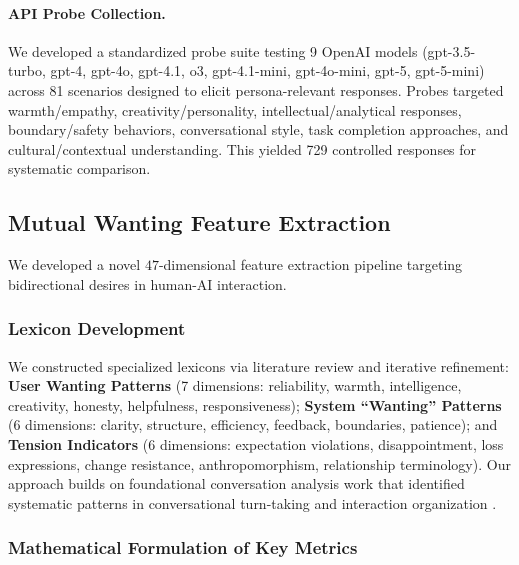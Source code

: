 \documentclass{article}
\begin{document}
\paragraph{API Probe Collection.}
We developed a standardized probe suite testing 9 OpenAI models (gpt-3.5-turbo, gpt-4, gpt-4o, gpt-4.1, o3, gpt-4.1-mini, gpt-4o-mini, gpt-5, gpt-5-mini) across 81 scenarios designed to elicit persona-relevant responses. Probes targeted warmth/empathy, creativity/personality, intellectual/analytical responses, boundary/safety behaviors, conversational style, task completion approaches, and cultural/contextual understanding. This yielded 729 controlled responses for systematic comparison.

\subsection{Mutual Wanting Feature Extraction}

We developed a novel $47$-dimensional feature extraction pipeline targeting bidirectional desires in human-AI interaction.

\subsubsection{Lexicon Development}

We constructed specialized lexicons via literature review and iterative refinement: \textbf{User Wanting Patterns} (7 dimensions: reliability, warmth, intelligence, creativity, honesty, helpfulness, responsiveness); \textbf{System ``Wanting'' Patterns} (6 dimensions: clarity, structure, efficiency, feedback, boundaries, patience); and \textbf{Tension Indicators} (6 dimensions: expectation violations, disappointment, loss expressions, change resistance, anthropomorphism, relationship terminology). Our approach builds on foundational conversation analysis work that identified systematic patterns in conversational turn-taking and interaction organization \citep{sacks1974simplest}.

\subsubsection{Mathematical Formulation of Key Metrics}
\end{document}
